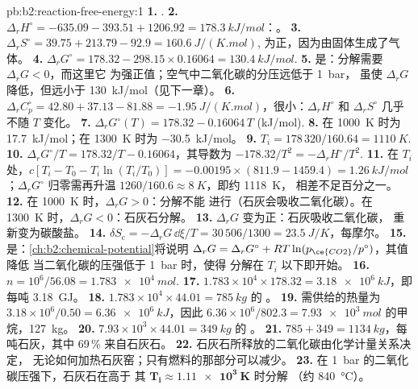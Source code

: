 \begin{solution}{pb:b2:reaction-free-energy:1}
\textbf{1.} .
\textbf{2.} $\Delta_r H^\circ = -635.09 - 393.51 + 1206.92 =
\qty{+178.3}{kJ/mol}$：。
\textbf{3.} $\Delta_r S^\circ = 39.75 + 213.79 - 92.9 = \qty{+160.6}{J/(K.mol)}$,
为正，因为由固体生成了气体。
\textbf{4.} $\Delta_r G^\circ = 178.32 - 298.15 \times 0.16064 =
\qty{+130.4}{kJ/mol}$.
\textbf{5.} 是：分解需要 $\Delta_r G < 0$，而这里它
为强正值；空气中二氧化碳的分压远低于 \qty{1}{bar}，
虽使 $\Delta_r G$ 降低，但远小于 \qty{130}{kJ/mol}（见下一章）。
\textbf{6.} $\Delta_r C^\circ_p = 42.80 + 37.13 - 81.88 =
\qty{-1.95}{J/(K.mol)}$，很小：$\Delta_r H^\circ$ 和 $\Delta_r S^\circ$
几乎不随 $T$ 变化。
\textbf{7.} $\Delta_r G^\circ(T) = 178.32 - 0.16064\,T$ (\unit{kJ/mol}).
\textbf{8.} 在 \qty{1000}{K} 时为 \qty{+17.7}{kJ/mol}；在
\qty{1300}{K} 时为 \qty{-30.5}{kJ/mol}。
\textbf{9.} $T_i = 178\,320/160.64 = \qty{1110}{K}$.
\textbf{10.} $\Delta_r G^\circ/T = 178.32/T - 0.16064$，其导数为
$-178.32/T^2 = -\Delta_r H^\circ/T^2$.
\textbf{11.} 在 $T_i$ 处，$c[T_i - T_0 - T_i\ln(T_i/T_0)] = -0.00195 \times
(811.9 - 1459.4) = \qty{+1.26}{kJ/mol}$；$\Delta_r G^\circ$ 归零需再升温
$1260/160.6 \approx \qty{8}{K}$，即约 \qty{1118}{K}，
相差不足百分之一。
\textbf{12.} 在 \qty{1000}{K} 时，$\Delta_r G > 0$：分解不能
进行（石灰会吸收二氧化碳）。在 \qty{1300}{K} 时，$\Delta_r G <
0$：石灰石分解。
\textbf{13.} $\Delta_r G$ 变为正：石灰吸收二氧化碳，
重新变为碳酸盐。
\textbf{14.} $\delta S_{\text{c}} = -\Delta_r G\,\dd\xi/T = 30\,506/1300 =
\qty{23.5}{J/K}$，每摩尔。
\textbf{15.} 是：\cref{ch:b2:chemical-potential}将说明
$\Delta_r G = \Delta_r G^\circ + RT\ln(p_{\ce{CO2}}/p^\circ)$，其值降低
当二氧化碳的压强低于 \qty{1}{bar} 时，使得
分解在 $T_i$ 以下即开始。
\textbf{16.} $n = 10^6/56.08 = \qty{1.783e4}{mol}$.
\textbf{17.} $1.783 \times 10^4 \times 178.32 = \qty{3.18e6}{kJ}$，即
每吨 \qty{3.18}{GJ}。
\textbf{18.} $1.783 \times 10^4 \times 44.01 = \qty{785}{kg}$ 的 。
\textbf{19.} 需供给的热量为 $3.18 \times 10^6/0.50 = \qty{6.36e6}{kJ}$，因此
$6.36 \times 10^6/802.3 = \qty{7.93e3}{mol}$ 的甲烷，\qty{127}{kg}。
\textbf{20.} $7.93 \times 10^3 \times 44.01 = \qty{349}{kg}$ 的 。
\textbf{21.} $785 + 349 = \qty{1134}{kg}$，每吨石灰，其中 69\,\%
来自石灰石。
\textbf{22.} 石灰石所释放的二氧化碳由化学计量关系决定，
无论如何加热石灰窑；只有燃料的那部分可以减少。
\textbf{23.} 在 \qty{1}{bar} 的二氧化碳压强下，石灰石在高于
其 $\boldsymbol{T_i \approx \qty{1.11e3}{K}}$ 时分解
（约 \qty{840}{\celsius}）。
\end{solution}
